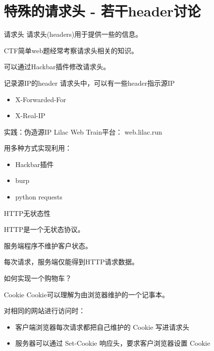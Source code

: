 \documentclass[UTF8]{ctexbeamer}
\begin{document}
\section{特殊的请求头 - 若干header讨论}
\begin{frame}{请求头}
    请求头(headers)用于提供一些的信息。
    
    CTF简单web题经常考察请求头相关的知识。
    
    \vspace{1em}
    
    可以通过Hackbar插件修改请求头。

\end{frame}

\begin{frame}{记录源IP的header}
    请求头中，可以有一些header指示源IP
    \begin{itemize}
        \item X-Forwarded-For
        \item X-Real-IP
    \end{itemize}
\end{frame}

\begin{frame}{实践：伪造源IP}
    Lilac Web Train平台： web.lilac.run

    用多种方式实现利用：

    \begin{itemize}
        \item Hackbar插件
        \item burp
        \item python requests
    \end{itemize}
\end{frame}

\begin{frame}{HTTP无状态性}

    HTTP是一个无状态协议。

    服务端程序不维护客户状态。

    每次请求，服务端仅能得到HTTP请求数据。
    
    \vspace{1em}
    
    如何实现一个购物车？
    
\end{frame}

\begin{frame}{Cookie}
    Cookie可以理解为由浏览器维护的一个记事本。
    
    对相同的网站进行访问时：
    
    \begin{itemize}
        \item 客户端浏览器每次请求都把自己维护的 Cookie 写进请求头
        \item 服务器可以通过 Set-Cookie 响应头，要求客户浏览器设置 Cookie
    \end{itemize}
\end{frame}
\end{document}
